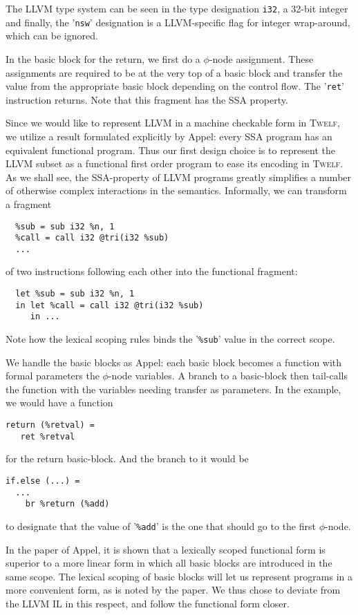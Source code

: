 \documentclass[a4paper, oneside, 10pt, draft]{memoir}
\newcommand{\twelf}{\textsc{Twelf}}
\begin{document}
The LLVM type system can be seen in the type designation \texttt{i32},
a 32-bit integer and finally, the '\texttt{nsw}' designation is a
LLVM-specific flag for integer wrap-around, which can be ignored.

In the basic block for the return, we first do a $\phi$-node
assignment. These assignments are required to be at the very top of a
basic block and transfer the value from the appropriate basic block
depending on the control flow. The '\texttt{ret}' instruction
returns. Note that this fragment has the SSA property.

Since we would like to represent LLVM in a machine checkable form in
\twelf{}, we utilize a result formulated explicitly by
Appel\cite{appel:1998:modern, appel:1998:ssa}: every SSA program has
an equivalent functional program. Thus our first design choice is to
represent the LLVM subset as a functional first order program to ease
its encoding in \twelf{}. As we shall see, the SSA-property of LLVM
programs greatly simplifies a number of otherwise complex interactions
in the semantics. Informally, we can transform a fragment
\label{llvm-consideration-let}
\begin{verbatim}
  %sub = sub i32 %n, 1
  %call = call i32 @tri(i32 %sub)
  ...
\end{verbatim}
of two instructions following each other into the functional fragment:
\begin{verbatim}
  let %sub = sub i32 %n, 1
  in let %call = call i32 @tri(i32 %sub)
     in ...
\end{verbatim}

Note how the lexical scoping rules binds the '\texttt{\%sub}' value
in the correct scope.

We handle the basic blocks as Appel: each basic block becomes a
function with formal parameters the $\phi$-node variables. A branch to
a basic-block then tail-calls the function with the variables needing
transfer as parameters. In the example, we would have a function
\begin{verbatim}
return (%retval) =
   ret %retval
\end{verbatim}
for the return basic-block. And the branch to it would be
\begin{verbatim}
if.else (...) =
  ...
    br %return (%add)
\end{verbatim}
to designate that the value of '\texttt{\%add}' is the one that should
go to the first $\phi$-node.

In the paper of Appel\cite{appel:1998:ssa}, it is shown that a
lexically scoped functional form is superior to a more linear form in
which all basic blocks are introduced in the same scope. The lexical
scoping of basic blocks will let us represent programs in a more
convenient form, as is noted by the paper. We thus chose to deviate
from the LLVM IL in this respect, and follow the functional form closer.
\end{document}
